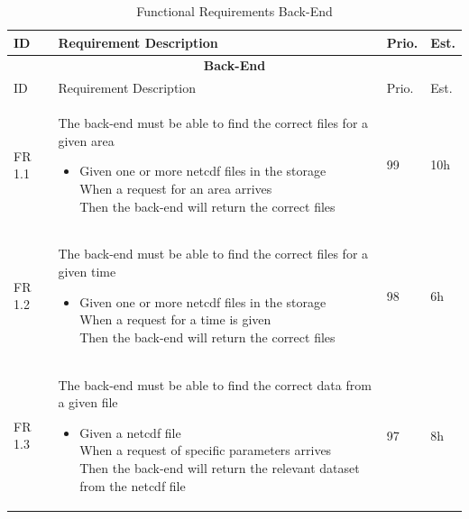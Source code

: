 \documentclass[11pt,a4paper,titlepage,oneside]{report}
\begin{document}
  \begin{longtable}{p{1.4cm} p{7.8cm} p{1cm} p{1cm} }
  \caption[]{Functional Requirements Back-End}\\
  \multicolumn{1}{p{1.4cm}}{ID} &
  \multicolumn{1}{p{7.8cm}}{Requirement Description} &
  \multicolumn{1}{p{1cm}}{Prio.} &
  \multicolumn{1}{p{1cm}}{Est.}
  \endhead

  \caption[Functional Requirements Back-End]{} \label{funcReqsBack} \\
  \hline \multicolumn{4}{c}{\textbf{Back-End}} \\
  \hline
  \multicolumn{1}{p{1.4cm}}{ID} &
  \multicolumn{1}{p{7.8cm}}{Requirement Description} &
  \multicolumn{1}{p{1cm}}{Prio.} &
  \multicolumn{1}{p{1cm}}{Est.}
  \endfirsthead
  
  \hline
  \multicolumn{4}{r}{{Continued on next page}} \\
  \endfoot

  \hline \hline
  \endlastfoot

  \hline  
  FR 1.1 & The back-end must be able to find the correct files for a given area
  
  \begin{itemize}
  \item \parbox[t]{6.8cm}{
        Given one or more \gls{netcdf} files in the storage \\ 
        When a request for an area arrives \\ 
        Then the back-end will return the correct files}
  \end{itemize}
   & 99 & 10h \\ \hline
  
  FR 1.2 & The back-end must be able to find the correct files for a given time 
  \begin{itemize}
  \item \parbox[t]{6.8cm}{
        Given one or more \gls{netcdf} files in the storage \\ 
        When a request for a time is given \\ 
        Then the back-end will return the correct files}
  \end{itemize}
  & 98 & 6h \\ \hline %

  FR 1.3 & The back-end must be able to find the correct data from a given file 
  \begin{itemize}
  \item \parbox[t]{6.8cm}{
        Given a \gls{netcdf} file \\ 
        When a request of specific parameters arrives \\ 
        Then the back-end will return the relevant dataset from the \gls{netcdf} file}
  \end{itemize}
  & 97 & 8h \\ \hline


\end{longtable}
\end{document}

